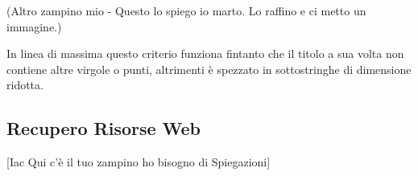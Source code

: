 \begin{center}(Altro zampino mio - Questo lo spiego io marto. Lo raffino e ci metto un immagine.)\end{center}

In linea di massima questo criterio funziona fintanto che il titolo a sua volta non contiene altre virgole o punti, altrimenti è spezzato in sottostringhe di dimensione ridotta.


\subsection{Recupero Risorse Web}
[Iac Qui c'è il tuo zampino ho bisogno di Spiegazioni]
